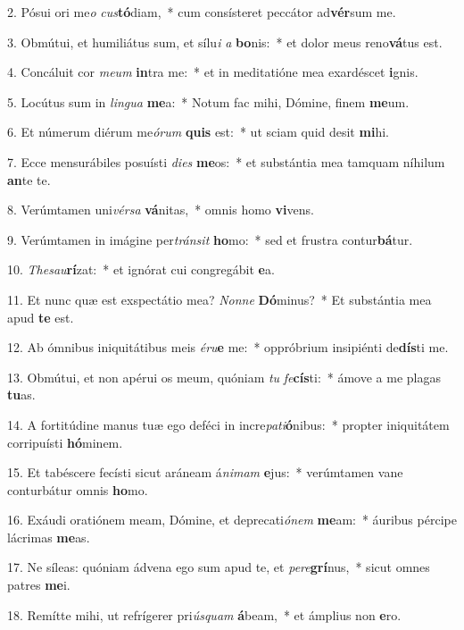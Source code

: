 2. Pósui ori me\textit{o} \textit{cus}\textbf{tó}diam,~*  cum consísteret peccátor ad\textbf{vér}sum me.\

3. Obmútui, et humiliátus sum, et sílu\textit{i} \textit{a} \textbf{bo}nis:~*  et dolor meus reno\textbf{vá}tus est.\

4. Concáluit cor \textit{me}\textit{um} \textbf{in}tra me:~*  et in meditatióne mea exardéscet \textbf{i}gnis.\

5. Locútus sum in \textit{lin}\textit{gua} \textbf{me}a:~*  Notum fac mihi, Dómine, finem \textbf{me}um.\

6. Et númerum diérum me\textit{ó}\textit{rum} \textbf{quis} est:~*  ut sciam quid desit \textbf{mi}hi.\

7. Ecce mensurábiles posuísti \textit{di}\textit{es} \textbf{me}os:~*  et substántia mea tamquam níhilum \textbf{an}te te.\

8. Verúmtamen uni\textit{vér}\textit{sa} \textbf{vá}nitas,~*  omnis homo \textbf{vi}vens.\

9. Verúmtamen in imágine per\textit{tráns}\textit{it} \textbf{ho}mo:~*  sed et frustra contur\textbf{bá}tur.\

10. \textit{The}\textit{sau}\textbf{rí}zat:~*  et ignórat cui congregábit \textbf{e}a.\

11. Et nunc quæ est exspectátio mea? \textit{Non}\textit{ne} \textbf{Dó}minus?~*  Et substántia mea apud \textbf{te} est.\

12. Ab ómnibus iniquitátibus meis \textit{é}\textit{ru}\textbf{e} me:~*  oppróbrium insipiénti de\textbf{dís}ti me.\

13. Obmútui, et non apérui os meum, quóniam \textit{tu} \textit{fe}\textbf{cís}ti:~*  ámove a me plagas \textbf{tu}as.\

14. A fortitúdine manus tuæ ego deféci in incre\textit{pa}\textit{ti}\textbf{ó}nibus:~*  propter iniquitátem corripuísti \textbf{hó}minem.\

15. Et tabéscere fecísti sicut aráneam á\textit{ni}\textit{mam} \textbf{e}jus:~*  verúmtamen vane conturbátur omnis \textbf{ho}mo.\

16. Exáudi oratiónem meam, Dómine, et deprecati\textit{ó}\textit{nem} \textbf{me}am:~*  áuribus pércipe lácrimas \textbf{me}as.\

17. Ne síleas: quóniam ádvena ego sum apud te, et \textit{per}\textit{e}\textbf{grí}nus,~*  sicut omnes patres \textbf{me}i.\

18. Remítte mihi, ut refrígerer pri\textit{ús}\textit{quam} \textbf{á}beam,~*  et ámplius non \textbf{e}ro.\


